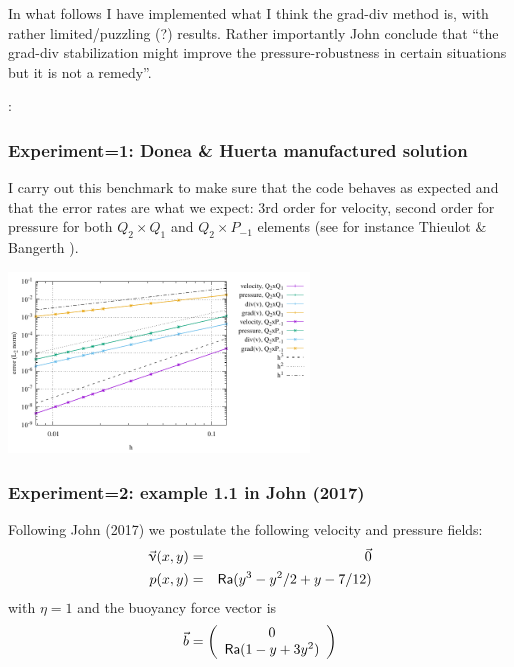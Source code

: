 In what follows I have implemented what I think the grad-div method is, with 
rather limited/puzzling (?) results.
Rather importantly John \etal conclude that ``the
grad-div stabilization might improve the pressure-robustness in certain situations but
it is not a remedy''. 

\Literature: \cite{ollh09}

\subsubsection*{Experiment=1: Donea \& Huerta manufactured solution}

I carry out this benchmark to make sure that the code behaves as expected and that the
error rates are what we expect: 3rd order for velocity, second order for pressure 
for both $Q_2\times Q_1$ and $Q_2\times P_{-1}$ elements (see for instance 
Thieulot \& Bangerth \cite{thba21}).

\begin{center}
\includegraphics[width=8cm]{python_codes/fieldstone_104/results/exp1/errors.pdf}
\end{center}


\subsubsection*{Experiment=2: example 1.1 in John \etal (2017)}
Following John \etal (2017) \cite{jolm17} we 
postulate the following velocity and pressure fields:
\begin{eqnarray}
\vec{\upnu}(x,y) &=& \vec{0} \nonumber\\
p(x,y) &=& {\mathsf{Ra}} ( y^3-y^2/2+y-7/12 ) \nonumber
\end{eqnarray}
with $\eta=1$ and the buoyancy force vector is
\[
\vec{b}=
\left(
\begin{array}{c}
0 \\ {\mathsf{Ra}}(1-y+3y^2)
\end{array}
\right)
\]

